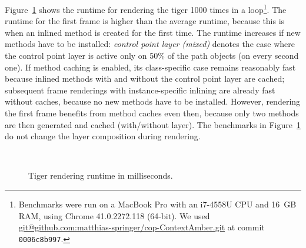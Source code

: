 \documentclass{sig-alternate}
\begin{document}
Figure~\ref{fig:rendering_runtime} shows the runtime for rendering the tiger 1000 times in a loop\footnote{Benchmarks were run on a MacBook Pro with an i7-4558U CPU and 16~GB RAM, using Chrome 41.0.2272.118 (64-bit). We used \url{git@github.com:matthias-springer/cop-ContextAmber.git} at commit \texttt{0006c8b997}.}. The runtime for the first frame is higher than the average runtime, because this is when an inlined method is created for the first time. The runtime increases if new methods have to be installed: \emph{control point layer (mixed)} denotes the case where the control point layer is active only on 50\% of the path objects (on every second one). If method caching is enabled, its class-specific case remains reasonably fast because inlined methods with and without the control point layer are cached; subsequent frame renderings with instance-specific inlining are already fast without caches, because no new methods have to be installed. However, rendering the first frame benefits from method caches even then, because only two methods are then generated and cached (with/without layer). The benchmarks in Figure~\ref{fig:rendering_runtime} do not change the layer composition during rendering. 

\begin{figure}[t]
    \centering
     \\
    \caption{Tiger rendering runtime in milliseconds.}
    \label{fig:rendering_runtime}
\end{figure}
\end{document}
